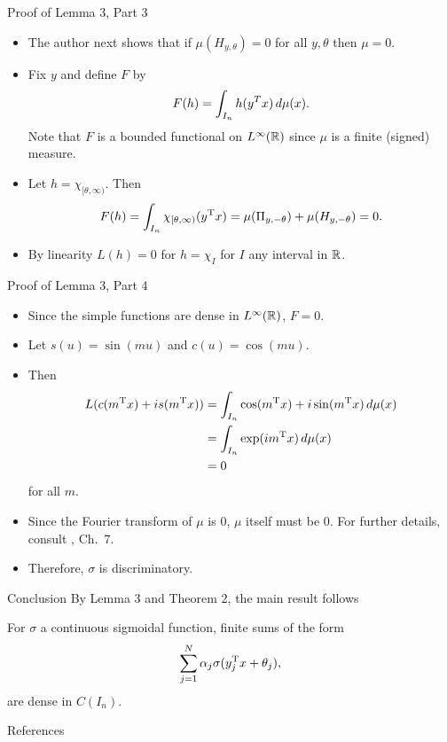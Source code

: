 \documentclass[11pt,letterpaper]{beamer}
\begin{document}
\begin{frame}{Proof of Lemma 3, Part 3}
  \begin{itemize}
  \item The author next shows that if $\mu(H_{ y,\theta})=0$ for all $ y,\theta$
    then $\mu=0$.
  \item Fix $y$ and define $F$ by
    \[
      F(h)=\int_{I_n} h( y^T x)\mathop{}\!d\mu(x).
    \]
    Note that $F$ is a bounded functional on $L^\infty(\mathbb{R})$ since $\mu$ is a
    finite (signed) measure.
  \item Let $h=\chi_{[\theta,\infty)}$. Then
    \[
      F(h)=\int_{I_n}\chi_{[\theta,\infty)}( y^{\mathrm{T}} x)= \mu(\Pi_{
        y,-\theta})+\mu(H_{ y,-\theta})=0.
    \]
  \item By linearity $L(h)=0$ for $h=\chi_{I}$ for $I$ any interval in $\mathbb{R}$.
\end{itemize}
\end{frame}

\begin{frame}{Proof of Lemma 3, Part 4}
  \begin{itemize}
  \item Since the simple functions are dense in $L^\infty(\mathbb{R})$, $F=0$.
  \item Let $s(u)=\sin(mu)$ and $c(u)=\cos(mu)$.
  \item Then
    \begin{align*}
      L(c(m^{\mathrm{T}} x)+i s(m^{\mathrm{T}} x))
      &=\int_{I_n}\cos(m^{\mathrm{T}} x)+i\sin(m^{\mathrm{T}} x)\mathop{}\!d\mu(x)\\
      &=\int_{I_n}\exp(i m^{\mathrm{T}} x)\mathop{}\!d\mu(x)\\
      &=0
    \end{align*}
    for all $m$.
  \item Since the Fourier transform of $\mu$ is $0$, $\mu$ itself must be $0$.
    For further details, consult \cite{rudin}, Ch.\ 7.
  \item Therefore, $\sigma$ is discriminatory.
  \end{itemize}
\end{frame}

\begin{frame}{Conclusion}
  By Lemma 3 and Theorem 2, the main result follows
  \setcounter{theorem}{0}
  \begin{theorem}
    For $\sigma$ a continuous sigmoidal function, finite sums of the form
    \[
      \sum_{j=1}^N \alpha_j\sigma( y_j^{\mathrm{T}} x+\theta_j),
    \]
  are dense in $C(I_n)$.
  \end{theorem}
\end{frame}

\begin{frame}{References}
\printbibliography
\end{frame}
\end{document}
